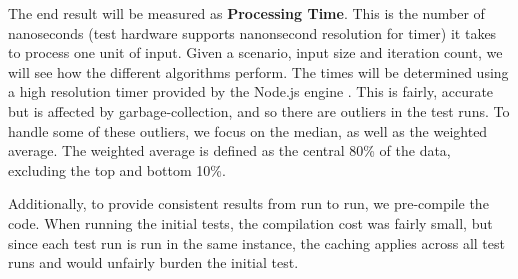 The end result will be measured as \textbf{Processing Time}. This is the number of nanoseconds (test hardware supports nanonsecond resolution for timer) it takes to process one unit of input.  Given a scenario, input size and iteration count, we will see how the different algorithms perform.  The times will be determined using a high resolution timer provided by the Node.js engine \cite{nodehr16}.  This is fairly, accurate but is affected by garbage-collection, and so there are outliers in the test runs. To handle some of these outliers, we focus on the median, as well as the weighted average. The weighted average is defined as the central 80\% of the data, excluding the top and bottom 10\%.

Additionally, to provide consistent results from run to run, we pre-compile the code.  When running the initial tests, the compilation cost was fairly small, but since each test run is run in the same \veight instance, the caching applies across all test runs and would unfairly burden the initial test.
